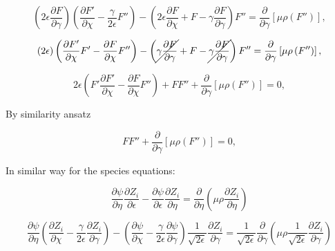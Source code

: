 \begin{equation*} 
\left(
2\epsilon
\frac{\partial F}{\partial \gamma}
\right)
\left(
    \frac{\partial F'}{\partial \chi}
    -
    \frac{\gamma}{2\epsilon}
    F''
\right)
-
\left(
        2\epsilon
        \frac{\partial F }{\partial \chi}
        +
        F 
        -
        \gamma
        \frac{\partial F}{\partial \gamma}
\right)
F''
=
\frac{\partial}{\partial \gamma}
\left[
    \mu\rho
    \left(
    F''
    \right)
\right]
,
\end{equation*} 

\begin{equation*} 
\left(
2\epsilon
\right)
\left(
    \frac{\partial F'}{\partial \chi}
    F'
        -
    \frac{\partial F }{\partial \chi}
    F''
\right)
-
\left(
        \cancel{
        \gamma
        \frac{\partial F}{\partial \gamma}
        }
        +
        F 
        -
        \cancel{
        \gamma
        \frac{\partial F}{\partial \gamma}
        }
\right)
F''
=
\frac{\partial}{\partial \gamma}
\left[
    \mu\rho
    \left(
    F''
    \right)
\right]
,
\end{equation*} 

\begin{equation*} 
2\epsilon
\left(
    F'
    \frac{\partial F'}{\partial \chi}
        -
    \frac{\partial F }{\partial \chi}
    F''
\right)
+
F
F''
+
\frac{\partial}{\partial \gamma}
\left[
    \mu\rho
    \left(
    F''
    \right)
\right]
=0
,
\end{equation*} 


By similarity ansatz

\begin{equation*} 
F
F''
+
\frac{\partial}{\partial \gamma}
\left[
    \mu\rho
    \left(
    F''
    \right)
\right]
=0
,
\end{equation*} 

In similar way for the 
species equations:

\begin{equation} 
\frac{\partial \psi}{\partial \eta}
\frac{\partial Z_{i}}{\partial \epsilon}
-
\frac{\partial \psi}{\partial \epsilon}
\frac{\partial Z_{i}}{\partial \eta}
=
\frac{\partial}{\partial \eta}
\left(\mu\rho  \frac{\partial Z_i}{\partial \eta}\right)
\end{equation} 

\begin{equation*} 
\frac{\partial \psi}{\partial \eta}
\left(
    \frac{\partial Z_{i}}{\partial \chi}
    -
    \frac{\gamma}{2\epsilon}
    \frac{\partial Z_{i}}{\partial \gamma}
\right)
-
\left(
    \frac{\partial \psi}{\partial \chi}
    -
    \frac{\gamma}{2\epsilon}
    \frac{\partial \psi}{\partial \gamma}
\right)
\frac{1}{\sqrt{2\epsilon}}
\frac{\partial Z_{i}}{\partial \gamma}
=
\frac{1}{\sqrt{2\epsilon}}
\frac{\partial }{\partial \gamma}
\left(\mu\rho  
\frac{1}{\sqrt{2\epsilon}}
\frac{\partial Z_i}{\partial \gamma}
\right)
\end{equation*} 

